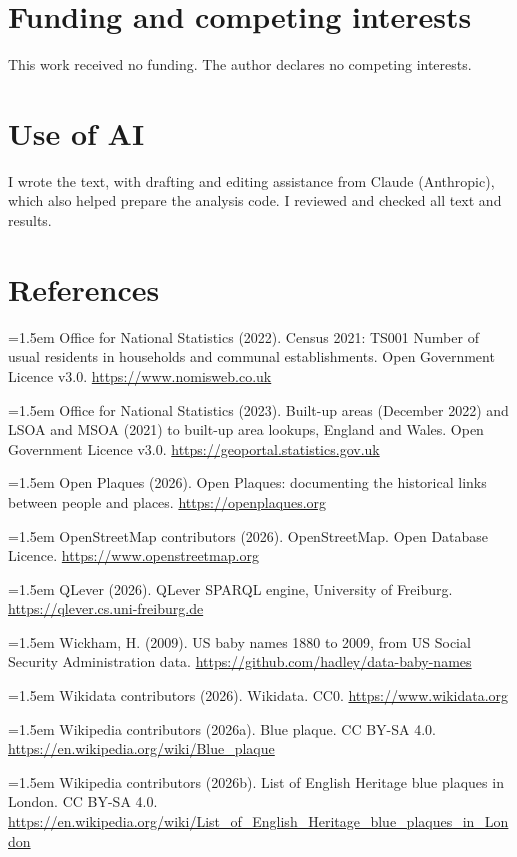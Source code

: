 \documentclass[11pt,a4paper]{article}
\begin{document}
\section*{Funding and competing interests}

This work received no funding. The author declares no competing interests.

\section*{Use of AI}

I wrote the text, with drafting and editing assistance from Claude (Anthropic), which also helped prepare the analysis code. I reviewed and checked all text and results.

\section*{References}
\small
\setlength{\parskip}{0.35em}
\hangindent=1.5em Office for National Statistics (2022). Census 2021: TS001 Number of usual residents in households and communal establishments. Open Government Licence v3.0. \url{https://www.nomisweb.co.uk}

\hangindent=1.5em Office for National Statistics (2023). Built-up areas (December 2022) and LSOA and MSOA (2021) to built-up area lookups, England and Wales. Open Government Licence v3.0. \url{https://geoportal.statistics.gov.uk}

\hangindent=1.5em Open Plaques (2026). Open Plaques: documenting the historical links between people and places. \url{https://openplaques.org}

\hangindent=1.5em OpenStreetMap contributors (2026). OpenStreetMap. Open Database Licence. \url{https://www.openstreetmap.org}

\hangindent=1.5em QLever (2026). QLever SPARQL engine, University of Freiburg. \url{https://qlever.cs.uni-freiburg.de}

\hangindent=1.5em Wickham, H. (2009). US baby names 1880 to 2009, from US Social Security Administration data. \url{https://github.com/hadley/data-baby-names}

\hangindent=1.5em Wikidata contributors (2026). Wikidata. CC0. \url{https://www.wikidata.org}

\hangindent=1.5em Wikipedia contributors (2026a). Blue plaque. CC BY-SA 4.0. \url{https://en.wikipedia.org/wiki/Blue_plaque}

\hangindent=1.5em Wikipedia contributors (2026b). List of English Heritage blue plaques in London. CC BY-SA 4.0. \url{https://en.wikipedia.org/wiki/List_of_English_Heritage_blue_plaques_in_London}
\end{document}
